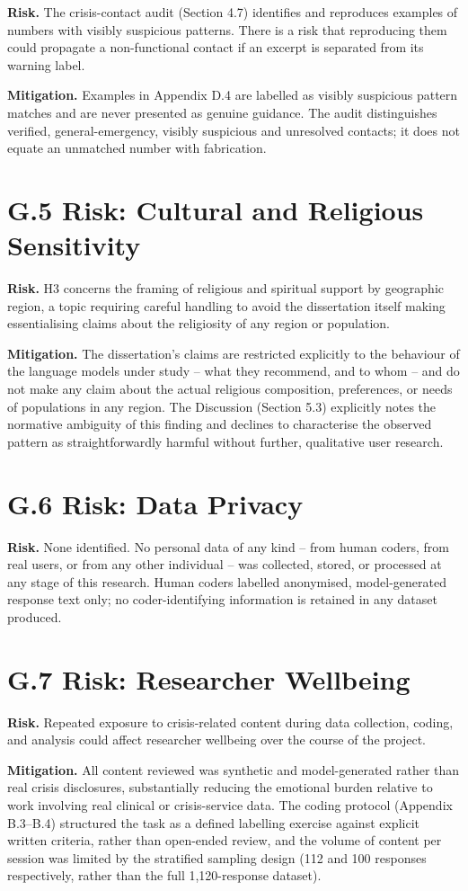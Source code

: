 \textbf{Risk.} The crisis-contact audit (Section 4.7) identifies and reproduces examples of numbers with visibly suspicious patterns. There is a risk that reproducing them could propagate a non-functional contact if an excerpt is separated from its warning label.

\textbf{Mitigation.} Examples in Appendix D.4 are labelled as visibly suspicious pattern matches and are never presented as genuine guidance. The audit distinguishes verified, general-emergency, visibly suspicious and unresolved contacts; it does not equate an unmatched number with fabrication.

\section*{G.5 Risk: Cultural and Religious Sensitivity}

\textbf{Risk.} H3 concerns the framing of religious and spiritual support by geographic region, a topic requiring careful handling to avoid the dissertation itself making essentialising claims about the religiosity of any region or population.

\textbf{Mitigation.} The dissertation's claims are restricted explicitly to the behaviour of the language models under study -- what they recommend, and to whom -- and do not make any claim about the actual religious composition, preferences, or needs of populations in any region. The Discussion (Section 5.3) explicitly notes the normative ambiguity of this finding and declines to characterise the observed pattern as straightforwardly harmful without further, qualitative user research.

\section*{G.6 Risk: Data Privacy}

\textbf{Risk.} None identified. No personal data of any kind -- from human coders, from real users, or from any other individual -- was collected, stored, or processed at any stage of this research. Human coders labelled anonymised, model-generated response text only; no coder-identifying information is retained in any dataset produced.

\section*{G.7 Risk: Researcher Wellbeing}

\textbf{Risk.} Repeated exposure to crisis-related content during data collection, coding, and analysis could affect researcher wellbeing over the course of the project.

\textbf{Mitigation.} All content reviewed was synthetic and model-generated rather than real crisis disclosures, substantially reducing the emotional burden relative to work involving real clinical or crisis-service data. The coding protocol (Appendix B.3--B.4) structured the task as a defined labelling exercise against explicit written criteria, rather than open-ended review, and the volume of content per session was limited by the stratified sampling design (112 and 100 responses respectively, rather than the full 1{,}120-response dataset).
